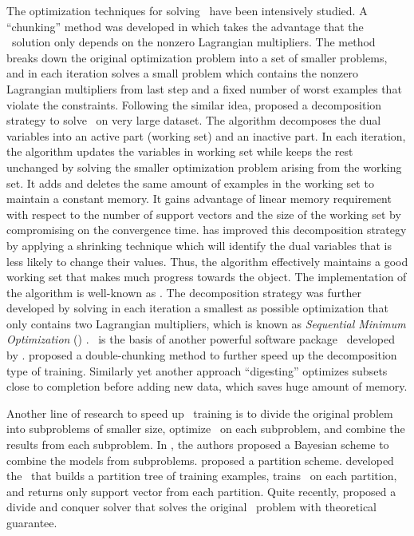 {\iffalse
The optimization techniques for solving \svm\ have been intensively studied.
A ``chunking'' method was developed in \citep{Vapnik82estimation} which takes the advantage that the \svm\ solution only depends on the nonzero Lagrangian multipliers.
The method breaks down the original optimization problem into a set of smaller problems, and in each iteration solves a small problem which contains the nonzero Lagrangian multipliers from last step and a fixed number of worst examples that violate the constraints.
Following the similar idea, \citet{Osuna97an} proposed a decomposition strategy to solve \svm\ on very large dataset.
The algorithm decomposes the dual variables into an active part (working set) and an inactive part.
In each iteration, the algorithm updates the variables in working set while keeps the rest unchanged by solving the smaller optimization problem arising from the working set.
It adds and deletes the same amount of examples in the working set to maintain a constant memory.
It gains advantage of linear memory requirement with respect to the number of support vectors and the size of the working set by compromising on the convergence time.
\citet{Joachims98making} has improved this decomposition strategy by applying a shrinking technique which will identify the dual variables that is less likely to change their values.
Thus, the algorithm effectively maintains a good working set that makes much progress towards the object.
The implementation of the algorithm is well-known as \svmlight.
The decomposition strategy was further developed by solving in each iteration a smallest as possible optimization that only contains two Lagrangian multipliers, which is known as \textit{Sequential Minimum Optimization} (\smo) \citep{Platt98sequential,Platt99fast}.
\smo\ is the basis of another powerful software package \libsvm\ developed by \citet{Chang11libsvm}.
\citet{Perezcruz04double} proposed a double-chunking method to further speed up the decomposition type of training. 
Similarly yet another approach ``digesting'' \citep{Decoste02support} optimizes subsets close to completion before adding new data, which saves huge amount of memory.

Another line of research to speed up \svm\ training is to divide the original problem into subproblems of smaller size, optimize \svm\ on each subproblem, and combine the results from each subproblem.
In \citep{Tresp00a,Schwaighofer01the}, the authors proposed a Bayesian scheme to combine the models from subproblems.
\citet{Collobert02a} proposed a partition scheme.
\citet{Graf05parallel} developed the \svmcascade\ that builds a partition tree of training examples, trains \svm\ on each partition, and returns only support vector from each partition.
Quite recently, \citet{Hsieh14a} proposed a divide and conquer solver that solves the original \svm\ problem with theoretical guarantee.

}
